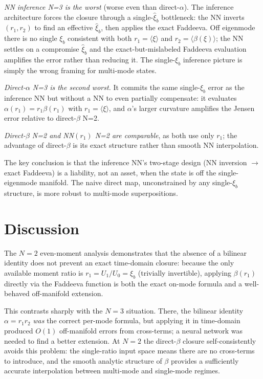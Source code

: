 \documentclass[11pt]{article}
\newcommand{\xib}{\xi_b}
\begin{document}
\emph{NN inference N=3 is the worst} (worse even than direct-$\alpha$).
The inference architecture forces the closure through a single-$\hat\xi_b$
bottleneck: the NN inverts $(r_1, r_2)$ to find an effective $\hat\xi_b$,
then applies the exact Faddeeva.  Off eigenmode there is no single $\xib$
consistent with both $r_1 = \langle\xi\rangle$ and
$r_2 = \langle\beta(\xi)\rangle$; the NN settles on a compromise
$\hat\xi_b$ and the exact-but-mislabeled Faddeeva evaluation amplifies
the error rather than reducing it.  The single-$\xib$ inference picture
is simply the wrong framing for multi-mode states.

\emph{Direct-$\alpha$ N=3 is the second worst.}  It commits the same
single-$\xib$ error as the inference NN but without a NN to even partially
compensate: it evaluates $\alpha(r_1) = r_1\beta(r_1)$ with $r_1 =
\langle\xi\rangle$, and $\alpha$'s larger curvature amplifies the Jensen
error relative to direct-$\beta$ N=2.

\emph{Direct-$\beta$ N=2 and NN$(r_1)$ N=2 are comparable}, as both
use only $r_1$; the advantage of direct-$\beta$ is its exact structure
rather than smooth NN interpolation.

The key conclusion is that the inference NN's two-stage design (NN inversion
$\to$ exact Faddeeva) is a liability, not an asset, when the state is off the
single-eigenmode manifold.  The naive direct map, unconstrained by any
single-$\xib$ structure, is more robust to multi-mode superpositions.

\section{Discussion}

The $N=2$ even-moment analysis demonstrates that the absence of a bilinear
identity does not prevent an exact time-domain closure: because the only
available moment ratio is $r_1 = U_1/U_0 = \xib$ (trivially invertible),
applying $\beta(r_1)$ directly via the Faddeeva function is both the exact
on-mode formula and a well-behaved off-manifold extension.

This contrasts sharply with the $N=3$ situation.  There, the bilinear
identity $\alpha = r_1 r_2$ \emph{was} the correct per-mode formula, but
applying it in time-domain produced $O(1)$ off-manifold errors from
cross-terms; a neural network was needed to find a better extension.
At $N=2$ the direct-$\beta$ closure self-consistently avoids this
problem: the single-ratio input space means there are no cross-terms to
introduce, and the smooth analytic structure of $\beta$ provides a
sufficiently accurate interpolation between multi-mode and single-mode
regimes.
\end{document}
